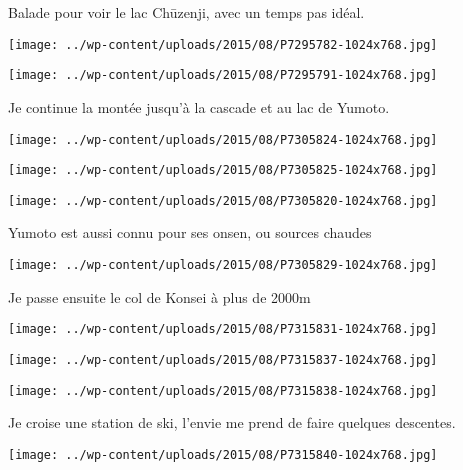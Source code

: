  Balade pour voir le lac Chūzenji, avec un temps pas idéal. \newline
 \newline
\centerline{\texttt{[image: ../wp-content/uploads/2015/08/P7295782-1024x768.jpg]} } 
 \newline
 \newline
\centerline{\texttt{[image: ../wp-content/uploads/2015/08/P7295791-1024x768.jpg]} } 
 \newline
 Je continue la montée jusqu'à la cascade et au lac de Yumoto. \newline
 \newline
\centerline{\texttt{[image: ../wp-content/uploads/2015/08/P7305824-1024x768.jpg]} } 
 \newline
 \newline
\centerline{\texttt{[image: ../wp-content/uploads/2015/08/P7305825-1024x768.jpg]} } 
 \newline
 \newline
\centerline{\texttt{[image: ../wp-content/uploads/2015/08/P7305820-1024x768.jpg]} } 
 \newline
 Yumoto est aussi connu pour ses onsen, ou sources chaudes \newline
 \newline
\centerline{\texttt{[image: ../wp-content/uploads/2015/08/P7305829-1024x768.jpg]} } 
 \newline
 Je passe ensuite le col de Konsei à plus de 2000m \newline
 \newline
\centerline{\texttt{[image: ../wp-content/uploads/2015/08/P7315831-1024x768.jpg]} } 
 \newline
 \newline
\centerline{\texttt{[image: ../wp-content/uploads/2015/08/P7315837-1024x768.jpg]} } 
 \newline
 \newline
\centerline{\texttt{[image: ../wp-content/uploads/2015/08/P7315838-1024x768.jpg]} } 
 \newline
 Je croise une station de ski, l'envie me prend de faire quelques descentes. \newline
 \newline
\centerline{\texttt{[image: ../wp-content/uploads/2015/08/P7315840-1024x768.jpg]} } 
 \newline
 \newline
